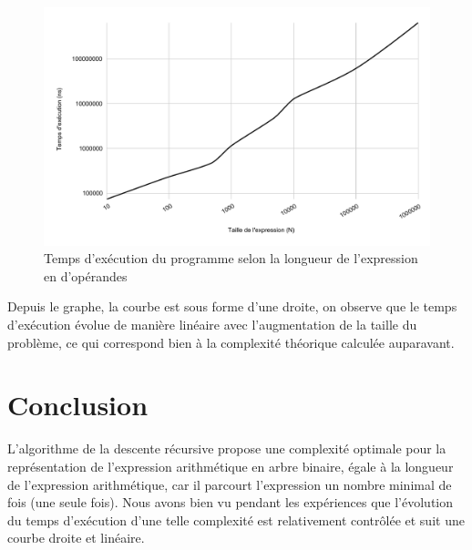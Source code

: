 \begin{figure}[H]
    \centering
        \includegraphics[scale=0.5]{./ressources/temps_execution.pdf}
        \caption{Temps d'exécution du programme selon la longueur de l'expression en d'opérandes}
    \label{fig:temps_exec}
\end{figure}
\par
Depuis le graphe, la courbe est sous forme d'une droite, on observe que le temps d'exécution évolue de manière linéaire avec l'augmentation de la taille du problème, ce qui correspond bien à la complexité théorique calculée auparavant. 

\section{Conclusion}
L'algorithme de la descente récursive propose une complexité optimale pour la représentation de l'expression arithmétique en arbre binaire, égale à la longueur de l'expression arithmétique, car il parcourt l'expression un nombre minimal de fois (une seule fois). Nous avons bien vu pendant les expériences que l'évolution du temps d'exécution d'une telle complexité est relativement contrôlée et suit une courbe droite et linéaire.
